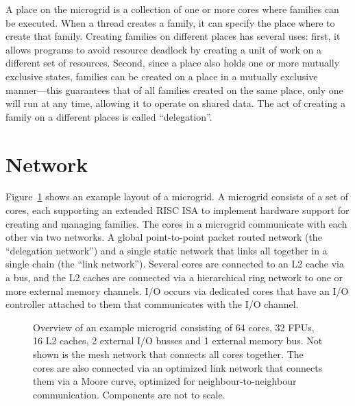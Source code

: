A place on the microgrid is a collection of one or more cores where families can be executed. When a thread creates a family, it can specify the place where to create that family. Creating families on different places has several uses: first, it allows programs to avoid resource deadlock by creating a unit of work on a different set of resources. Second, since a place also holds one or more mutually exclusive states, families can be created on a place in a mutually exclusive manner---this guarantees that of all families created on the same place, only one will run at any time, allowing it to operate on shared data. The act of creating a family on a different places is called ``delegation''.

\section{Network}
Figure~\ref{fig:microgrid} shows an example layout of a microgrid. A microgrid consists of a set of cores, each supporting an extended RISC ISA to implement hardware support for creating and managing families. The cores in a microgrid communicate with each other via two networks. A global point-to-point packet routed network (the ``delegation network'') and a single static network that links all together in a single chain (the ``link network''). Several cores are connected to an L2 cache via a bus, and the L2 caches are connected via a hierarchical ring network to one or more external memory channels. I/O occurs via dedicated cores that have an I/O controller attached to them that communicates with the I/O channel.

\begin{figure}
 \begin{center}
  
  \caption{Overview of an example microgrid consisting of 64 cores, 32 FPUs, 16 L2 caches, 2 external I/O busses and 1 external memory bus. Not shown is the mesh network that connects all cores together. The cores are also connected via an optimized link network that connects them via a Moore curve, optimized for neighbour-to-neighbour communication. Components are not to scale.}
  \label{fig:microgrid}
 \end{center}
\end{figure}
